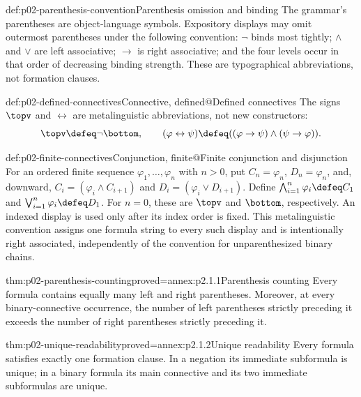 \begin{hbconvention}{def:p02-parenthesis-convention}{Parenthesis omission and binding}
The grammar's parentheses are object-language symbols.  Expository displays
may omit outermost parentheses under the following convention:
\(\neg\) binds most tightly; \(\land\) and \(\lor\) are left associative;
\(\to\) is right associative; and the four levels occur in that order of
decreasing binding strength.  These are typographical abbreviations, not
formation clauses.
\end{hbconvention}

\begin{hbdefinition}{def:p02-defined-connectives}{Connective, defined@Defined connectives}
The signs \(\topv\) and \(\leftrightarrow\) are metalinguistic
abbreviations, not new constructors:
\[
 \topv\defeq\neg\bottom,
 \qquad
 (\varphi\leftrightarrow\psi)
 \defeq((\varphi\to\psi)\land(\psi\to\varphi)).
\]
\end{hbdefinition}

\begin{hbdefinition}{def:p02-finite-connectives}{Conjunction, finite@Finite conjunction and disjunction}
For an ordered finite sequence \(\varphi_1,\ldots,\varphi_n\) with
\(n>0\), put \(C_n=\varphi_n\), \(D_n=\varphi_n\), and, downward,
\(C_i=(\varphi_i\land C_{i+1})\) and
\(D_i=(\varphi_i\lor D_{i+1})\).  Define
\(\bigwedge_{i=1}^{n}\varphi_i\defeq C_1\) and
\(\bigvee_{i=1}^{n}\varphi_i\defeq D_1\).  For \(n=0\), these are
\(\topv\) and \(\bottom\), respectively.  An indexed display is used only
after its index order is fixed.  This metalinguistic convention assigns one
formula string to every such display and is intentionally right associated,
independently of the convention for unparenthesized binary chains.
\end{hbdefinition}

\begin{hblemma}{thm:p02-parenthesis-counting}{proved=annex:p2.1.1}{Parenthesis counting}
Every formula contains equally many left and right parentheses.  Moreover,
at every binary-connective occurrence, the number of left parentheses
strictly preceding it exceeds the number of right parentheses strictly
preceding it.
\end{hblemma}

\begin{hbtheorem}{thm:p02-unique-readability}{proved=annex:p2.1.2}{Unique readability}
Every formula satisfies exactly one formation clause.  In a negation its
immediate subformula is unique; in a binary formula its main connective and
its two immediate subformulas are unique.
\end{hbtheorem}


